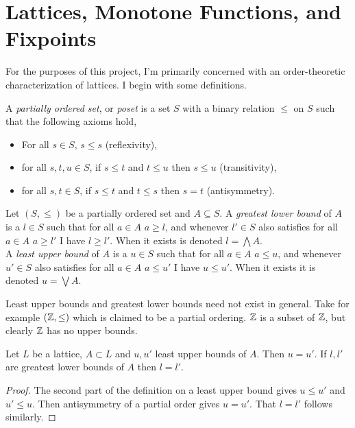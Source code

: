 \section{Lattices, Monotone Functions, and Fixpoints}
For the purposes of this project, I'm primarily concerned with an order-theoretic characterization of lattices.
I begin with some definitions.
\begin{definition}[Poset]\label{posetdef}
  A \emph{partially ordered set}, or \emph{poset} is a set $S$ with a binary relation $\leq$ on $S$ such that the following axioms hold,
  \begin{itemize}
    \item For all $s \in S$, $s \leq s$ (reflexivity),
    \item for all $s, t, u \in S$, if $s \leq t$ and $t \leq u$ then $s \leq u$ (transitivity),
    \item for all $s, t \in S$, if $s \leq t$ and $t \leq s$ then $s = t$ (antisymmetry).
  \end{itemize}
\end{definition}
\begin{definition}
  Let $(S, \leq)$ be a partially ordered set and $A \subseteq S$. A \emph{greatest lower bound} of $A$ is
  a $l \in S$ such that for all $a \in A$ $a \geq l$, and whenever $l' \in S$ also satisfies for all $a \in A$
  $a \geq l'$ I have $l \geq l'$. When it exists is denoted $l = \bigwedge A$. \\
  A \emph{least upper bound} of $A$ is a $u \in S$ such that for all $a \in A$ $a \leq u$, and whenever $u' \in S$ also satisfies for all $a \in A$
  $a \leq u'$ I have $u \leq u'$. When it exists it is denoted $u = \bigvee A$.
\end{definition}
\begin{remark}
  Least upper bounds and greatest lower bounds need not exist in general. Take for example $(\mathbb{Z}, \leq)$ which
  is claimed to be a partial ordering. $\mathbb{Z}$ is a subset of $\mathbb{Z}$, but clearly $\mathbb{Z}$ has no upper bounds.
\end{remark}
\begin{lemma}
  Let $L$ be a lattice, $A \subset L$ and $u, u'$ least upper bounds of $A$. Then $u = u'$.
  If $l, l'$ are greatest lower bounds of $A$ then $l = l'$.
\end{lemma}
\begin{proof}
  The second part of the definition on a least upper bound gives $u \leq u'$ and $u' \leq u$. Then
  antisymmetry of a partial order gives $u = u'$. That $l = l'$ follows similarly.
\end{proof}

